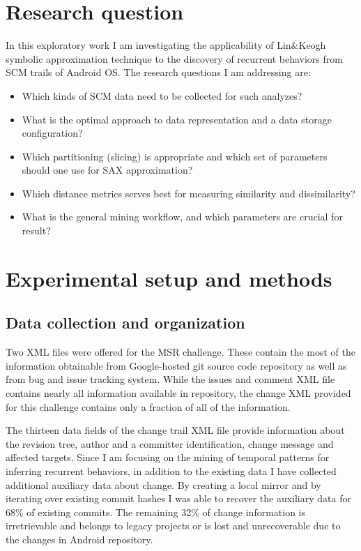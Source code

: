 \documentclass[10pt, conference, compsocconf]{IEEEtran}
\begin{document}
\section{Research question}
In this exploratory work I am investigating the applicability of Lin\&Keogh \cite{citeulike:2821475} 
symbolic approximation technique to the discovery of recurrent behaviors from SCM trails 
of Android OS.
The research questions I am addressing are: 
\begin{itemize}
 \item Which kinds of SCM data need to be collected for such analyzes?
 \item What is the optimal approach to data representation and a data storage configuration?
 \item Which partitioning (slicing) is appropriate and which set of parameters should one use for SAX approximation?
 \item Which distance metrics serves best for measuring similarity and dissimilarity?
 \item What is the general mining workflow, and which parameters are crucial for result?
\end{itemize}

\section{Experimental setup and methods}
\subsection{Data collection and organization}
Two XML files were offered for the MSR challenge. These contain the most of the information obtainable 
from Google-hosted git source code repository as well as from bug and issue tracking system.
While the issues and comment XML file contains nearly all information available in repository, 
the change XML provided for this challenge contains only a fraction of all of the information.

The thirteen data fields of the change trail XML file provide information about the revision 
tree, author and a committer identification, change message and affected targets. 
Since I am focusing on the mining of temporal patterns for inferring recurrent behaviors, 
in addition to the existing data I have collected additional auxiliary data about change. By creating
a local mirror and by iterating over existing commit hashes I was able to recover the auxiliary 
data for 68\% of existing commits. The remaining 32\% of change information is irretrievable and 
belongs to legacy projects or is lost and unrecoverable due to the changes in Android repository. 
\end{document}
